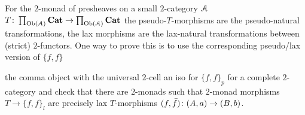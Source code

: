 \documentclass[a4paper,11pt,oneside,openany]{scrbook}
\begin{document}
\begin{exmp}
	For the $2$-monad of presheaves on a small $2$-category $\operatorname{\mathcal{A}}$ $T \colon \prod_{\operatorname{Ob}(\operatorname{\mathcal{A}})} {\normalfont\textbf{Cat}} \to \prod_{\operatorname{Ob}(\operatorname{\mathcal{A}})} {\normalfont\textbf{Cat}}$ the pseudo-$T$-morphisms are
	the pseudo-natural transformations, the lax morphisms are the lax-natural transformations between (strict) $2$-functors. One way to prove this is to use
	the corresponding pseudo/lax version of $\{f,f\}$
	\begin{center}
	\end{center}
	the comma object with the universal $2$-cell an iso for $\{f,f\}_{p}$ for a complete $2$-category and check that there are $2$-monads such that
	$2$-monad morphisms $T \to  \{f,f\}_{l}$ are precisely lax $T$-morphisms $(f,\bar{f}) \colon (A,a) \to (B,b)$.
\end{exmp}
\end{document}
